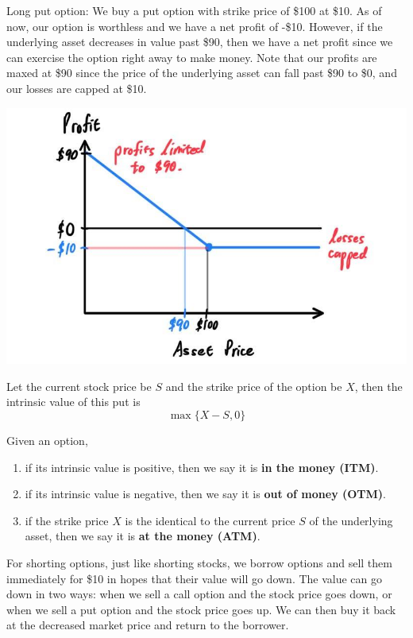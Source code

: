 \documentclass{article}
\begin{document}
\begin{definition}
Long put option: We buy a put option with strike price of \$100 at \$10. As of now, our option is worthless and we have a net profit of -\$10. However, if the underlying asset decreases in value past \$90, then we have a net profit since we can exercise the option right away to make money. Note that our profits are maxed at \$90 since the price of the underlying asset can fall past \$90 to \$0, and our losses are capped at \$10. 
\begin{center}
    \includegraphics[scale=0.3]{img/long_put.jpg}
\end{center}
Let the current stock price be $S$ and the strike price of the option be $X$, then the intrinsic value of this put is 
\[\max\{X - S, 0\}\]
\end{definition}

\begin{definition}
Given an option, 
\begin{enumerate}
    \item if its intrinsic value is positive, then we say it is \textbf{in the money (ITM)}. 
    \item if its intrinsic value is negative, then we say it is \textbf{out of money (OTM)}. 
    \item if the strike price $X$ is the identical to the current price $S$ of the underlying asset, then we say it is \textbf{at the money (ATM)}. 
\end{enumerate}
\end{definition}

For shorting options, just like shorting stocks, we borrow options and sell them immediately for \$10 in hopes that their value will go down. The value can go down in two ways: when we sell a call option and the stock price goes down, or when we sell a put option and the stock price goes up. We can then buy it back at the decreased market price and return to the borrower. 
\end{document}
